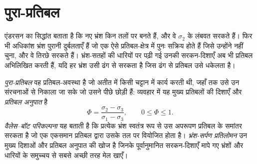 \begin{omfigure}

\par{}\label{fig:b3:structural-analysis:flinn}
\end{omfigure}

\section{पुरा-प्रतिबल}\label{sec:b3:structural-analysis:palaeostress}

एंडरसन का सिद्धांत बताता है कि नए भ्रंश किन तलों पर बनते हैं, और वे
$\sigma_2$ के लंबवत सरकते हैं। फिर भी अधिकांश भ्रंश पुरानी दुर्बलताएँ हैं
जो एक ऐसे प्रतिबल-क्षेत्र में पुनः सक्रिय होते हैं जिसे उन्होंने नहीं चुना, और वे
तिरछे सरकते हैं। भ्रंश-सतहों की धारियों पर पढ़ी गई उनकी सरकन-दिशाएँ
अब भी प्रतिबल अभिलिखित करती हैं, यदि हर भ्रंश उसी ढंग से सरकता है जिस ढंग से प्रतिबल
उसे धकेलता है।

\begin{definition}[पुरा-प्रतिबल, वैलेस--बॉट परिकल्पना, प्रतिबल अनुपात, भ्रंश-सर्पण प्रतिलोमन]\label{def:b3:structural-analysis:palaeostress}
\emph{पुरा-प्रतिबल} वह प्रतिबल-अवस्था है जो अतीत में
किसी चट्टान में कार्य करती थी, जहाँ तक उसे उन संरचनाओं से निकाला जा सके जो उसने पीछे छोड़ी हैं:
व्यवहार में यह मुख्य प्रतिबलों की दिशाएँ और
\emph{प्रतिबल अनुपात} है
\[
  \Phi = \frac{\sigma_2 - \sigma_3}{\sigma_1 - \sigma_3}, \qquad 0 \le \Phi
  \le 1 .
\]
\emph{वैलेस--बॉट परिकल्पना} यह बताती है
कि प्रत्येक भ्रंश स्वतंत्र रूप से उस अपरूपण प्रतिबल के समांतर सरकता है जो एक
एकसमान प्रतिबल द्वारा उसके तल पर वियोजित होता है। \emph{भ्रंश-सर्पण
प्रतिलोमन} उन मुख्य दिशाओं और प्रतिबल अनुपात की खोज है
जिनके पूर्वानुमानित सरकन-दिशाएँ मापे गए भ्रंशों और धारियों के समुच्चय से सबसे
अच्छी तरह मेल खाएँ।
\end{definition}

